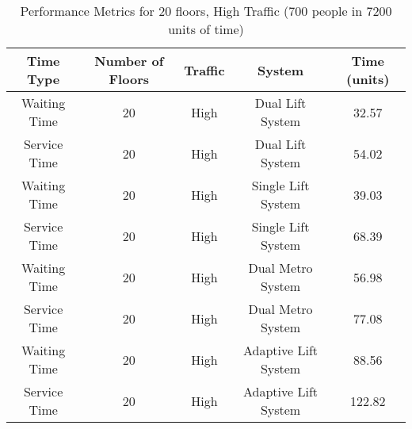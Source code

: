 \documentclass[12pt,a4paper]{report}
\begin{document}
\begin{table}[H]
\centering
\begin{tabular}{|c|c|c|c|c|}
\hline
\textbf{Time Type}    & \textbf{Number of Floors} & \textbf{Traffic} & \textbf{System}     & \textbf{Time (units)} \\ \hline
Waiting Time         & 20                    & High             & Dual Lift System              & 32.57              \\ \hline
Service Time         & 20                    & High             & Dual Lift System               & 54.02              \\ \hline
Waiting Time         & 20                    & High             & Single Lift System            & 39.03              \\ \hline
Service Time         & 20                    & High             & Single Lift System            & 68.39              \\ \hline
Waiting Time         & 20                    & High             & Dual Metro System         & 56.98              \\ \hline
Service Time         & 20                    & High             & Dual Metro System         & 77.08              \\ \hline
Waiting Time         & 20                     & High         & Adaptive Lift System           & 88.56             \\ \hline
Service Time         & 20                     & High         & Adaptive Lift System           & 122.82            \\ \hline
\end{tabular}
\caption{Performance Metrics for 20 floors, High Traffic (700 people in 7200 units of time)}
\end{table}
\end{document}
